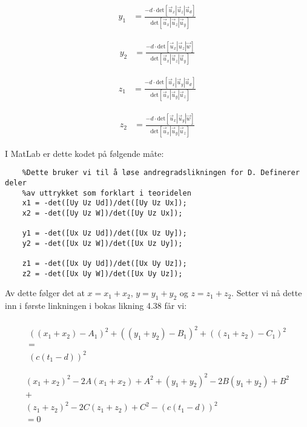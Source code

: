 \begin{align}
	y_1&=\frac{-d\cdot\text{det}[\vec{u}_x|\vec{u}_z | \vec{u}_d]}{\text{det}[\vec{u}_x|\vec{u}_z | \vec{u}_y]}\nonumber 
\end{align}

\begin{align}
    y_2&=\frac{-d\cdot\text{det}[\vec{u}_x|\vec{u}_z | \vec{w}]}{\text{det}[\vec{u}_x|\vec{u}_z | \vec{u}_y]}\nonumber 
\end{align}

\begin{align}
    z_1&=\frac{-d\cdot\text{det}[\vec{u}_x|\vec{u}_y | \vec{u}_d]}{\text{det}[\vec{u}_x|\vec{u}_y | \vec{u}_z]}\nonumber
\end{align}

\begin{align}
    z_2&=\frac{-d\cdot\text{det}[\vec{u}_x|\vec{u}_y | \vec{w}]}{\text{det}[\vec{u}_x|\vec{u}_y | \vec{u}_z]}\nonumber 
\end{align}

I MatLab er dette kodet på følgende måte: 
\begin{lstlisting}
	%Dette bruker vi til å løse andregradslikningen for D. Definerer deler 
	%av uttrykket som forklart i teoridelen 
	x1 = -det([Uy Uz Ud])/det([Uy Uz Ux]);
	x2 = -det([Uy Uz W])/det([Uy Uz Ux]);

	y1 = -det([Ux Uz Ud])/det([Ux Uz Uy]);
	y2 = -det([Ux Uz W])/det([Ux Uz Uy]);

	z1 = -det([Ux Uy Ud])/det([Ux Uy Uz]);
	z2 = -det([Ux Uy W])/det([Ux Uy Uz]);
\end{lstlisting} 

Av dette følger det at $x=x_1+x_2$, $y=y_1+y_2$ og $z=z_1+z_2$. Setter vi nå dette inn i første linkningen i bokas likning 4.38 får vi: 

\begin{multline}
	\\
    ((x_1+x_2)-A_1)^2+((y_1+y_2)-B_1)^2+((z_1+z_2)-C_1)^2\\
    =\\
    (c(t_1-d))^2 \\\nonumber
\end{multline}
\begin{multline}
	\\
  (x_1+x_2)^2-2A(x_1+x_2)+A^2+(y_1+y_2)^2-2B(y_1+y_2)+B^2\\
    +\\
    (z_1+z_2)^2-2C(z_1+z_2)+C^2-(c(t_1-d))^2\\
    =0 \nonumber 	\\
\end{multline}

